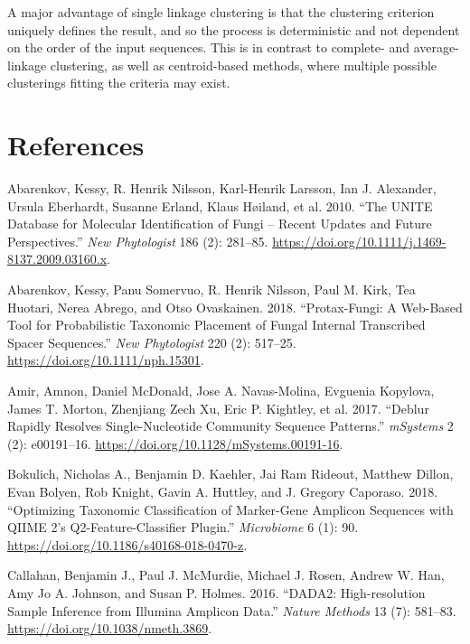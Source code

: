 \documentclass[
]{article}
\newlength{\cslhangindent}
\newenvironment{CSLReferences}[2] %
 {\begin{list}{}{%
  \setlength{\itemindent}{0pt}
  \setlength{\leftmargin}{0pt}
  \setlength{\parsep}{0pt}
  \ifodd #1
   \setlength{\leftmargin}{\cslhangindent}
   \setlength{\itemindent}{-1\cslhangindent}
  \fi
  \setlength{\itemsep}{#2\baselineskip}}}
 {\end{list}}
\begin{document}
A major advantage of single linkage clustering is that the clustering criterion uniquely defines the result, and so the process is deterministic
and not dependent on the order of the input sequences.
This is in contrast to complete- and average-linkage clustering, as well as centroid-based methods, where multiple possible clusterings fitting the criteria may exist.

\section*{References}\label{references}

\label{refs}
\begin{CSLReferences}{1}{0}
Abarenkov, Kessy, R. Henrik Nilsson, Karl-Henrik Larsson, Ian J. Alexander, Ursula Eberhardt, Susanne Erland, Klaus Høiland, et al. 2010. {``The {UNITE} Database for Molecular Identification of Fungi -- Recent Updates and Future Perspectives.''} \emph{New Phytologist} 186 (2): 281--85. \url{https://doi.org/10.1111/j.1469-8137.2009.03160.x}.

Abarenkov, Kessy, Panu Somervuo, R. Henrik Nilsson, Paul M. Kirk, Tea Huotari, Nerea Abrego, and Otso Ovaskainen. 2018. {``Protax-Fungi: A Web-Based Tool for Probabilistic Taxonomic Placement of Fungal Internal Transcribed Spacer Sequences.''} \emph{New Phytologist} 220 (2): 517--25. \url{https://doi.org/10.1111/nph.15301}.

Amir, Amnon, Daniel McDonald, Jose A. Navas-Molina, Evguenia Kopylova, James T. Morton, Zhenjiang Zech Xu, Eric P. Kightley, et al. 2017. {``Deblur {Rapidly Resolves Single-Nucleotide Community Sequence Patterns}.''} \emph{mSystems} 2 (2): e00191--16. \url{https://doi.org/10.1128/mSystems.00191-16}.

Bokulich, Nicholas A., Benjamin D. Kaehler, Jai Ram Rideout, Matthew Dillon, Evan Bolyen, Rob Knight, Gavin A. Huttley, and J. Gregory Caporaso. 2018. {``Optimizing Taxonomic Classification of Marker-Gene Amplicon Sequences with {QIIME} 2's Q2-Feature-Classifier Plugin.''} \emph{Microbiome} 6 (1): 90. \url{https://doi.org/10.1186/s40168-018-0470-z}.

Callahan, Benjamin J., Paul J. McMurdie, Michael J. Rosen, Andrew W. Han, Amy Jo A. Johnson, and Susan P. Holmes. 2016. {``{DADA2}: {High-resolution} Sample Inference from {Illumina} Amplicon Data.''} \emph{Nature Methods} 13 (7): 581--83. \url{https://doi.org/10.1038/nmeth.3869}.


\end{CSLReferences}
\end{document}
